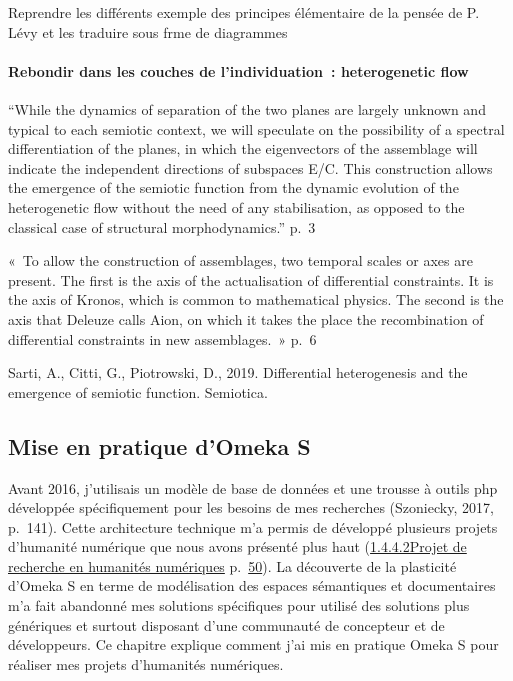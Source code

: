 \documentclass[
  letterpaper,
  DIV=11,
  numbers=noendperiod]{scrreprt}
\let\oldparagraph\paragraph
\renewcommand{\paragraph}[1]{\oldparagraph{#1}\mbox{}}
\begin{document}
Reprendre les différents exemple des principes élémentaire de la pensée
de P. Lévy et les traduire sous frme de diagrammes

\hypertarget{rebondir-dans-les-couches-de-lindividuation-heterogenetic-flow}{%
\paragraph{Rebondir dans les couches de l'individuation~: heterogenetic
flow}\label{rebondir-dans-les-couches-de-lindividuation-heterogenetic-flow}}

``While the dynamics of separation of the two planes are largely unknown
and typical to each semiotic context, we will speculate on the
possibility of a spectral differentiation of the planes, in which the
eigenvectors of the assemblage will indicate the independent directions
of subspaces E/C. This construction allows the emergence of the semiotic
function from the dynamic evolution of the heterogenetic flow without
the need of any stabilisation, as opposed to the classical case of
structural morphodynamics.'' p.~3

«~To allow the construction of assemblages, two temporal scales or axes
are present. The first is the axis of the actualisation of differential
constraints. It is the axis of Kronos, which is common to mathematical
physics. The second is the axis that Deleuze calls Aion, on which it
takes the place the recombination of differential constraints in new
assemblages.~» p.~6

Sarti, A., Citti, G., Piotrowski, D., 2019. Differential heterogenesis
and the emergence of semiotic function. Semiotica.

\hypertarget{sec-pratiquesOmk}{%
\subsection{Mise en pratique d'Omeka S}\label{sec-pratiquesOmk}}

Avant 2016, j'utilisais un modèle de base de données et une trousse à
outils php développée spécifiquement pour les besoins de mes recherches
(Szoniecky, 2017, p.~141). Cette architecture technique m'a permis de
développé plusieurs projets d'humanité numérique que nous avons présenté
plus haut (\protect\hyperlink{anchor-59}{1.4.4.2Projet de recherche en
humanités numériques} p.~\protect\hyperlink{anchor-59}{50}). La
découverte de la plasticité d'Omeka S en terme de modélisation des
espaces sémantiques et documentaires m'a fait abandonné mes solutions
spécifiques pour utilisé des solutions plus génériques et surtout
disposant d'une communauté de concepteur et de développeurs. Ce chapitre
explique comment j'ai mis en pratique Omeka S pour réaliser mes projets
d'humanités numériques.
\end{document}
